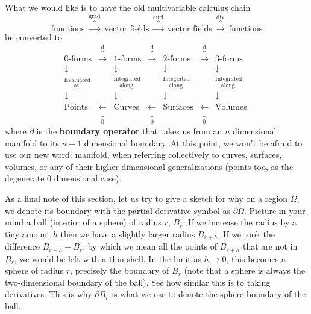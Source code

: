 	What we would like is to have the old multivariable calculus chain
	\begin{equation*}
		\text{functions} ~ \overbrace{\longrightarrow}^{\text{grad}}
		~ \text{vector fields} ~ \overbrace{\longrightarrow}^{\text{curl}}
		~ \text{vector fields} ~ \overbrace{\longrightarrow}^{\text{div}} 
		~ \text{functions} 
	\end{equation*}
	be converted to
	\begin{equation*}
		~~~~~~
		\begin{matrix}
			\text{0-forms} & \overbrace{\longrightarrow}^\mathrm d & 
			\text{1-forms} & \overbrace{\longrightarrow}^\mathrm d & 
			\text{2-forms} & \overbrace{\longrightarrow}^\mathrm d & 
			\text{3-forms}  \\
			\downarrow & & \downarrow & & \downarrow & & \downarrow \\
			^{\text{Evaluated}}_{\text{~~~~~at}} & & 
			^{\text{Integrated}}_{\text{~~~along}} & &
			^{\text{Integrated}}_{\text{~~~along}} & &
			^{\text{Integrated}}_{\text{~~~along}} & &\\
			\downarrow & & \downarrow & & \downarrow & & \downarrow \\
			\text{Points} & \underbrace{\longleftarrow}_\partial & 
			\text{Curves} & \underbrace{\longleftarrow}_\partial & 
			\text{Surfaces} & \underbrace{\longleftarrow}_\partial & \text{Volumes}
			
		\end{matrix}
	\end{equation*}
	where $\partial$ is the \textbf{boundary operator} that takes us from an $n$ dimensional manifold to its $n-1$ dimensional boundary. At this point, we won't be afraid to use our new word: manifold, when referring collectively to curves, surfaces, volumes, or any of their higher dimensional generalizations (points too, as the degenerate 0 dimensional case). 
	
	As a final note of this section, let us try to give a sketch for why on a region $\Omega$, we denote its boundary with the partial derivative symbol as $\partial \Omega$. Picture in your mind a ball (interior of a sphere) of radius $r$,  $B_r$. If we increase the radius by a tiny amount $h$ then we have a slightly larger radius $B_{r+h}$. If we took the difference $B_{r+h} - B_r$, by which we mean all the points of $B_{r+h}$ that are not in $B_r$, we would be left with a thin shell. In the limit as $h \rightarrow 0$, this becomes a sphere of radius $r$, precisely the boundary of $B_r$ (note that a sphere is always the two-dimensional boundary of the ball). See how similar this is to taking derivatives. This is why $\partial B_r$ is what we use to denote the sphere boundary of the ball. 
	

